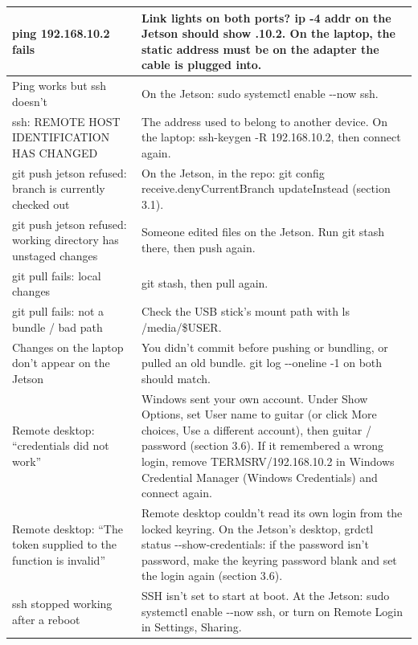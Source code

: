 \documentclass[11pt,letterpaper]{article}
\newcommand{\code}[1]{\textcolor{codeblue}{\ttfamily\smaller\relax #1}}
\begin{document}
{\begin{longtable}{|>{\raggedright\arraybackslash}p{}|>{\raggedright\arraybackslash}p{}|}
\code{ping 192.168.10.2} fails & Link lights on both ports? \code{ip -{}4 addr} on the Jetson should show \code{192.168.10.2}. On the laptop, the static address must be on the adapter the cable is plugged into. \\ \hline
Ping works but \code{ssh} doesn't & On the Jetson: \code{sudo systemctl enable -{}-{}now ssh}. \\ \hline
\code{ssh}: REMOTE HOST IDENTIFICATION HAS CHANGED & The address used to belong to another device. On the laptop: \code{ssh-{}\allowbreak{}keygen -{}R 192.168.10.2}, then connect again. \\ \hline
\code{git push jetson} refused: branch is currently checked out & On the Jetson, in the repo: \code{git config receive.denyCurrentBranch updateInstead} (section 3.1). \\ \hline
\code{git push jetson} refused: working directory has unstaged changes & Someone edited files on the Jetson. Run \code{git stash} there, then push again. \\ \hline
\code{git pull} fails: local changes & \code{git stash}, then pull again. \\ \hline
\code{git pull} fails: not a bundle / bad path & Check the USB stick's mount path with \code{ls /\allowbreak{}media/\allowbreak{}\$USER}. \\ \hline
Changes on the laptop don't appear on the Jetson & You didn't commit before pushing or bundling, or pulled an old bundle. \code{git log -{}-{}oneline -{}1} on both should match. \\ \hline
Remote desktop: ``credentials did not work'' & Windows sent your own account. Under Show Options, set User name to \code{guitar} (or click More choices, Use a different account), then \code{guitar} / \code{password} (section 3.6). If it remembered a wrong login, remove \code{TERMSRV/\allowbreak{}192.168.10.2} in Windows Credential Manager (Windows Credentials) and connect again. \\ \hline
Remote desktop: ``The token supplied to the function is invalid'' & Remote desktop couldn't read its own login from the locked keyring. On the Jetson's desktop, \code{grdctl status -{}-{}show-{}\allowbreak{}credentials}: if the password isn't \code{password}, make the keyring password blank and set the login again (section 3.6). \\ \hline
\code{ssh} stopped working after a reboot & SSH isn't set to start at boot. At the Jetson: \code{sudo systemctl enable -{}-{}now ssh}, or turn on Remote Login in Settings, Sharing. \\ \hline

\end{longtable}}
\end{document}
